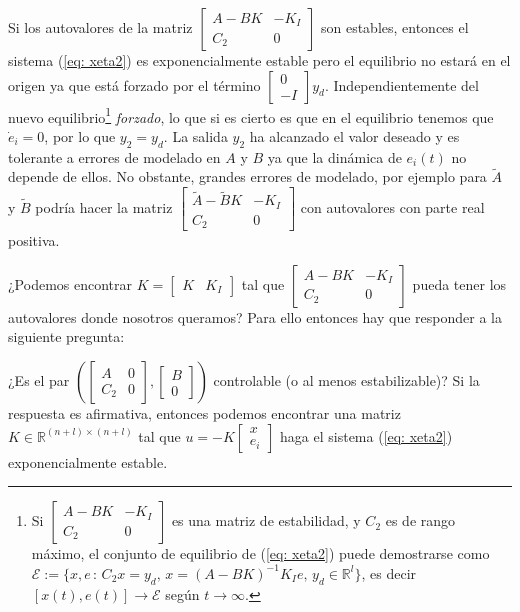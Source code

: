 Si los autovalores de la matriz $\begin{bmatrix}A-BK & -K_I \\ C_2 & 0\end{bmatrix}$ son estables, entonces el sistema (\ref{eq: xeta2}) es exponencialmente estable pero el equilibrio no estará en el origen ya que está forzado por el término $\begin{bmatrix}0 \\ -I\end{bmatrix} y_d$. Independientemente del nuevo equilibrio\footnote{Si $\begin{bmatrix}A-BK & -K_I \\ C_2 & 0\end{bmatrix}$ es una matriz de estabilidad, y $C_2$ es de rango máximo, el conjunto de equilibrio de (\ref{eq: xeta2}) puede demostrarse como $\mathcal{E} := \{x, e \, : \, C_2x = y_d, \, x = (A-BK)^{-1}K_Ie, \, y_d\in\mathbb{R}^l\}$, es decir $[x(t),e(t)] \to \mathcal{E}$ según $t\to\infty$.
	} \emph{forzado}, lo que si es cierto es que en el equilibrio tenemos que $\dot e_i = 0$, por lo que $y_2 = y_d$. La salida $y_2$ ha alcanzado el valor deseado y es tolerante a errores de modelado en $A$ y $B$ ya que la dinámica de $e_i(t)$ no depende de ellos. No obstante, grandes errores de modelado, por ejemplo para $\tilde A$ y $\tilde B$ podría hacer la matriz $\begin{bmatrix}\tilde A-\tilde BK & -K_I \\ C_2 & 0\end{bmatrix}$ con autovalores con parte real positiva.

¿Podemos encontrar $K = \begin{bmatrix}K & K_I\end{bmatrix}$ tal que $\begin{bmatrix}A-BK & -K_I \\ C_2 & 0\end{bmatrix}$ pueda tener los autovalores donde nosotros queramos? Para ello entonces hay que responder a la siguiente pregunta:

¿Es el par $\left(\begin{bmatrix}A & 0 \\ C_2 & 0\end{bmatrix}, \begin{bmatrix}B \\ 0 \end{bmatrix}\right)$ controlable (o al menos estabilizable)? Si la respuesta es afirmativa, entonces podemos encontrar una matriz $K\in\mathbb{R}^{(n+l)\times(n+l)}$ tal que $u = -K \begin{bmatrix}x \\ e_i \end{bmatrix}$ haga el sistema (\ref{eq: xeta2}) exponencialmente estable.


